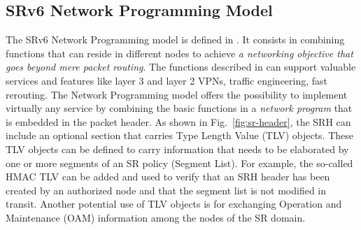 \subsection{SRv6 Network Programming Model}
\label{sec:sr_net_prog}

The SRv6 Network Programming model is defined in \cite{id-srv6-network-prog}. It consists in combining functions that can reside in different nodes to achieve \textit{a networking objective that goes beyond mere packet routing}. The functions described in \cite{id-srv6-network-prog} can support valuable services and features like layer 3 and layer 2 VPNs, traffic engineering, fast rerouting. The Network Programming model offers the possibility to implement virtually any service by combining the basic functions in a \textit{network program} that is embedded in the packet header. As shown in Fig.~\ref{fig:sr-header}, the SRH can include an optional section that carries Type Length Value (TLV) objects. These TLV objects can be defined to carry information that needs to be elaborated by one or more segments of an SR policy (Segment List). For example, the so-called HMAC TLV can be added and used to verify that an SRH header has been created by an authorized node and that the segment list is not modified in transit. Another potential use of TLV objects is for exchanging Operation and Maintenance (OAM) information among the nodes of the SR domain.



